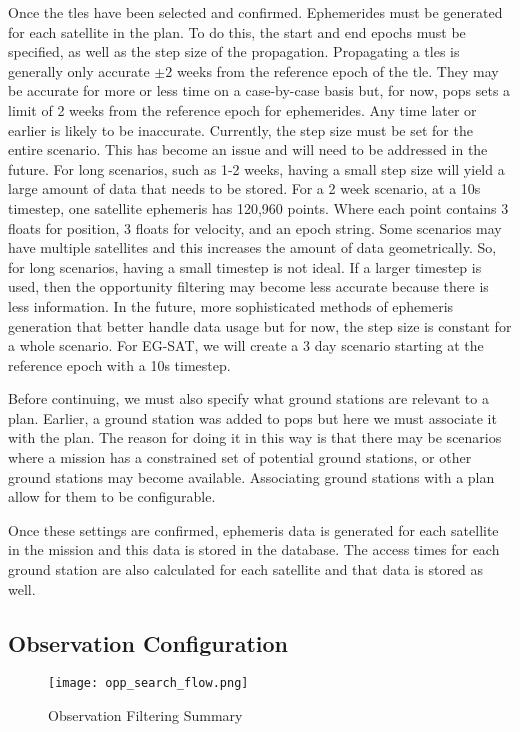 Once the \glspl{tle} have been selected and confirmed. Ephemerides must be
generated for each satellite in the plan. To do this, the start and end epochs
must be specified, as well as the step size of the propagation. Propagating a
\glspl{tle} is generally only accurate $\pm 2$ weeks from the reference epoch
of the \gls{tle}. They may be accurate for more or less time on a case-by-case
basis but, for now, \gls{pops} sets a limit of 2 weeks from the reference epoch
for ephemerides. Any time later or earlier is likely to be inaccurate.
Currently, the step size must be set for the entire scenario. This has become
an issue and will need to be addressed in the future. For long scenarios, such
as 1-2 weeks, having a small step size will yield a large amount of data that
needs to be stored. For a 2 week scenario, at a 10s timestep, one satellite
ephemeris has 120,960 points.  Where each point contains 3 floats for position,
3 floats for velocity, and an epoch string. Some scenarios may have multiple
satellites and this increases the amount of data geometrically. So, for long
scenarios, having a small timestep is not ideal. If a larger timestep is used,
then the opportunity filtering may become less accurate because there is less
information. In the future, more sophisticated methods of ephemeris generation
that better handle data usage but for now, the step size is constant for a
whole scenario. For EG-SAT, we will create a 3 day scenario starting at the
reference epoch with a 10s timestep. 

Before continuing, we must also specify what ground stations are relevant to a
plan. Earlier, a ground station was added to \gls{pops} but here we must
associate it with the plan. The reason for doing it in this way is that there
may be scenarios where a mission has a constrained set of potential ground
stations, or other ground stations may become available. Associating ground
stations with a plan allow for them to be configurable. 

Once these settings are confirmed, ephemeris data is generated for each
satellite in the mission and this data is stored in the database. The access
times for each ground station are also calculated for each satellite and that
data is stored as well.


\subsection{Observation Configuration}

\begin{figure}[h]
    \centering
    \texttt{[image: opp\_search\_flow.png]} 
    \caption{Observation Filtering Summary}
    \label{fig:obs_fil} 
\end{figure}

